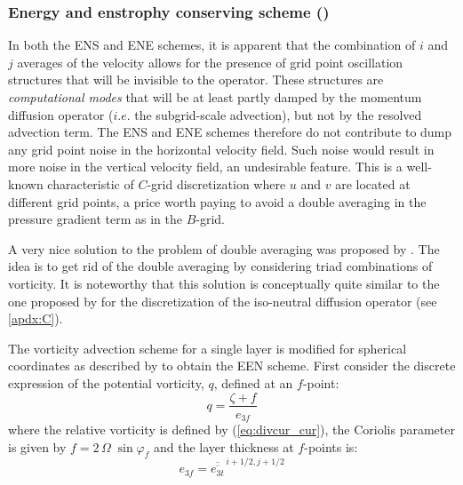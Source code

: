\documentclass[../tex_main/NEMO_manual]{subfiles}
\begin{document}
\subsubsection{Energy and enstrophy conserving scheme (\protect{}) }
\label{subsec:DYN_vor_een}

In both the ENS and ENE schemes,
it is apparent that the combination of $i$ and $j$ averages of the velocity allows for
the presence of grid point oscillation structures that will be invisible to the operator.
These structures are \textit{computational modes} that will be at least partly damped by
the momentum diffusion operator ($i.e.$ the subgrid-scale advection), but not by the resolved advection term.
The ENS and ENE schemes therefore do not contribute to dump any grid point noise in the horizontal velocity field.
Such noise would result in more noise in the vertical velocity field, an undesirable feature.
This is a well-known characteristic of $C$-grid discretization where
$u$ and $v$ are located at different grid points,
a price worth paying to avoid a double averaging in the pressure gradient term as in the $B$-grid.

A very nice solution to the problem of double averaging was proposed by \citet{Arakawa_Hsu_MWR90}.
The idea is to get rid of the double averaging by considering triad combinations of vorticity.
It is noteworthy that this solution is conceptually quite similar to the one proposed by
\citep{Griffies_al_JPO98} for the discretization of the iso-neutral diffusion operator (see \autoref{apdx:C}).

The \citet{Arakawa_Hsu_MWR90} vorticity advection scheme for a single layer is modified 
for spherical coordinates as described by \citet{Arakawa_Lamb_MWR81} to obtain the EEN scheme. 
First consider the discrete expression of the potential vorticity, $q$, defined at an $f$-point: 
\begin{equation} \label{eq:pot_vor}
q  = \frac{\zeta +f} {e_{3f} }
\end{equation}
where the relative vorticity is defined by (\autoref{eq:divcur_cur}),
the Coriolis parameter is given by $f=2 \,\Omega \;\sin \varphi _f $ and the layer thickness at $f$-points is: 
\begin{equation} \label{eq:een_e3f}
e_{3f} = \overline{\overline {e_{3t} }} ^{\,i+1/2,j+1/2}
\end{equation}
\end{document}
